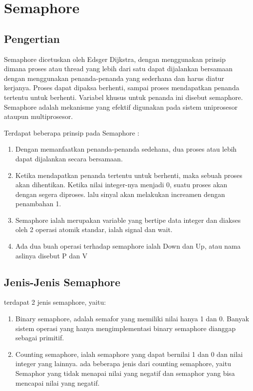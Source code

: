 
\section{Semaphore}

	\subsection{Pengertian}
	Semaphore dicetuskan oleh Edsger Dijkstra, dengan menggunakan prinsip  dimana proses atau thread yang lebih dari satu dapat dijalankan bersamaan dengan menggunakan penanda-penanda yang sederhana dan harus diatur kerjanya. Proses dapat dipaksa berhenti, sampai proses mendapatkan penanda tertentu untuk berhenti. Variabel khusus untuk penanda ini disebut semaphore. Semaphore adalah mekanisme yang efektif digunakan pada sistem uniprosesor ataupun multiprosesor.
	
	Terdapat beberapa prinsip pada Semaphore :
	\begin{enumerate}
		\item Dengan memanfaatkan penanda-penanda sedehana, dua proses atau lebih dapat dijalankan secara bersamaan.
		\item Ketika mendapatkan penanda tertentu untuk berhenti, maka sebuah proses akan dihentikan. Ketika nilai integer-nya menjadi 0, suatu proses akan dengan segera diproses. lalu sinyal akan melakukan increamen dengan penambahan 1.
		\item Semaphore ialah merupakan variable yang bertipe data integer dan diakses oleh 2 operasi atomik standar, ialah signal dan wait.
		\item Ada dua buah operasi terhadap semaphore ialah Down dan Up, atau nama aslinya disebut P dan V
	\end{enumerate}
	
	\subsection{Jenis-Jenis Semaphore}
	terdapat 2 jenis semaphore, yaitu: 
	\begin{enumerate}
		\item Binary semaphore, adalah semafor yang memiliki nilai hanya 1 dan 0. Banyak sistem operasi yang hanya mengimplementasi binary semaphore dianggap sebagai primitif.
		\item Counting semaphore, ialah semaphore yang dapat bernilai 1 dan 0 dan nilai integer yang lainnya. ada beberapa jenis dari counting semaphore, yaitu Semaphor yang tidak menapai nilai yang negatif dan semaphor yang bisa mencapai nilai yang negatif.
	\end{enumerate}
	
